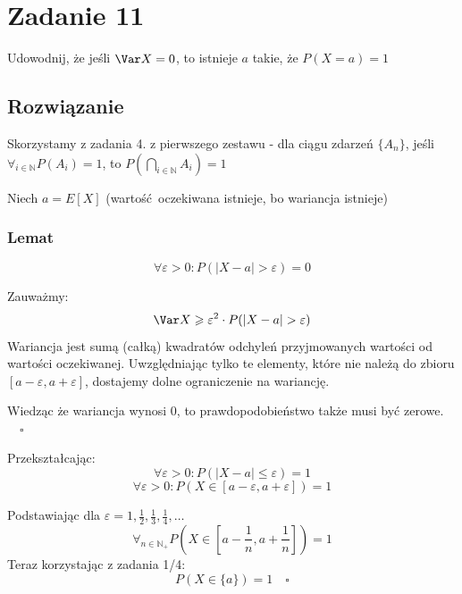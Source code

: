 \section{Zadanie 11}
Udowodnij, że jeśli \(\Var X = 0\), to istnieje \(a\)
takie, że \(P(X=a)=1\)

\subsection*{Rozwiązanie}
Skorzystamy z zadania 4. z pierwszego zestawu - dla ciągu zdarzeń
\(\{A_n\}\), jeśli \(\forall_{i\in\mathbb{N}} P(A_i) = 1\), to
\(P(\bigcap_{i\in\mathbb{N}} A_i) = 1\)

Niech \(a = E[X]\) (wartość oczekiwana istnieje, bo wariancja istnieje)

\subsubsection*{Lemat}
\[\forall \varepsilon > 0: P(|X-a| > \varepsilon) = 0\]

Zauważmy:
\[\Var X \geqslant
	\varepsilon^2 \cdot P(|X-a| > \varepsilon)\]
Wariancja jest sumą (całką) kwadratów odchyleń przyjmowanych wartości
od wartości oczekiwanej. Uwzględniając tylko te elementy, które nie
należą do zbioru \([a-\varepsilon, a+\varepsilon]\), dostajemy dolne
ograniczenie na wariancję.

Wiedząc że wariancja wynosi 0, to prawdopodobieństwo także musi być
zerowe. \(\quad\square\)

Przekształcając:
\[\forall \varepsilon > 0: P(|X-a| \leqslant \varepsilon) = 1\]
\[\forall \varepsilon > 0: P(X \in [a-\varepsilon, a+\varepsilon]) = 1\]

Podstawiając dla
\(\varepsilon = 1, \frac1{2}, \frac1{3}, \frac1{4}, \ldots\)
\[\forall_{n\in\mathbb{N_+}}
	P\left(X\in\left[a-\frac1{n}, a+\frac1{n}\right]\right) = 1\]
Teraz korzystając z zadania 1/4:
\[P(X\in\{a\}) = 1\quad\square\]
